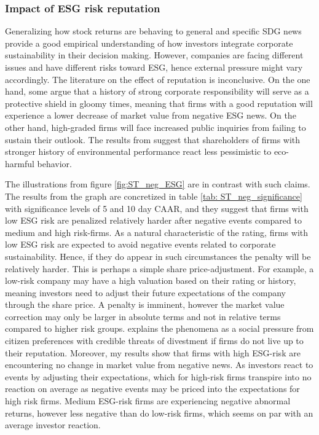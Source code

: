 \subsubsection{Impact of ESG risk reputation}

Generalizing how stock returns are behaving to general and specific SDG news provide a good empirical understanding of how investors integrate corporate sustainability in their decision making. However, companies are facing different issues and have different risks toward ESG, hence external pressure might vary accordingly. The literature on the effect of reputation is inconclusive. On the one hand, some argue that a history of strong corporate responsibility will serve as a protective shield in gloomy times, meaning that firms with a good reputation will experience a lower decrease of market value from negative ESG news. On the other hand, high-graded firms will face increased public inquiries from failing to sustain their outlook. The results from \cite{flammer2013corporate} suggest that shareholders of firms with stronger history of environmental performance react less pessimistic to eco-harmful behavior.



The illustrations from figure \ref{fig:ST_neg_ESG} are in contrast with such claims. The results from the graph are concretized in table \ref{tab: ST_neg_significance} with significance levels of 5 and 10 day CAAR, and they suggest that firms with low ESG risk are penalized relatively harder after negative events compared to medium and high risk-firms. As a natural characteristic of the rating, firms with low ESG risk are expected to avoid negative events related to corporate sustainability. Hence, if they do appear in such circumstances the penalty will be relatively harder. This is perhaps a simple share price-adjustment. For example, a low-risk company may have a high valuation based on their rating or history, meaning investors need to adjust their future expectations of the company through the share price. A penalty is imminent, however the market value correction may only be larger in absolute terms and not in relative terms compared to higher risk groups. \cite{baron2009positive} explains the phenomena as a social pressure from citizen preferences with credible threats of divestment if firms do not live up to their reputation. Moreover, my results show that firms with high ESG-risk are encountering no change in market value from negative news. As investors react to events by adjusting their expectations, which for high-risk firms transpire into no reaction on average as negative events may be priced into the expectations for high risk firms. Medium ESG-risk firms are experiencing negative abnormal returns, however less negative than do low-risk firms, which seems on par with an average investor reaction.   

